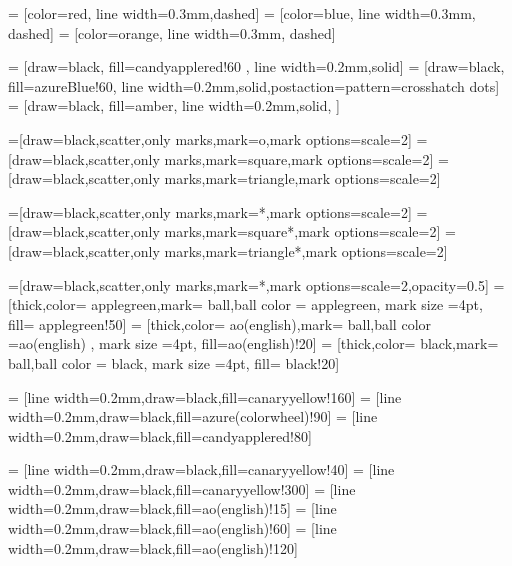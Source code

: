                 = [color=red, line width=0.3mm,dashed]
   = [color=blue, line width=0.3mm, dashed]
  = [color=orange, line width=0.3mm, dashed]


 = [draw=black, fill=candyapplered!60   , line width=0.2mm,solid]
 = [draw=black, fill=azureBlue!60, line width=0.2mm,solid,postaction={pattern=crosshatch dots}]
 = [draw=black, fill=amber, line width=0.2mm,solid,  ]



=[draw=black,scatter,only marks,mark=o,mark options={scale=2}] 
   =[draw=black,scatter,only marks,mark=square,mark options={scale=2}]
  =[draw=black,scatter,only marks,mark=triangle,mark options={scale=2}]

=[draw=black,scatter,only marks,mark=*,mark options={scale=2}] 
   =[draw=black,scatter,only marks,mark=square*,mark options={scale=2}]
  =[draw=black,scatter,only marks,mark=triangle*,mark options={scale=2}]

=[draw=black,scatter,only marks,mark=*,mark options={scale=2},opacity=0.5]
 = [thick,color= applegreen,mark= ball,ball color = applegreen, mark size =4pt, fill= applegreen!50]
    = [thick,color= ao(english),mark= ball,ball color =ao(english) , mark size =4pt, fill=ao(english)!20]
   = [thick,color= black,mark= ball,ball color = black, mark size =4pt, fill= black!20]


 =   [line width=0.2mm,draw=black,fill=canaryyellow!160]
 =   [line width=0.2mm,draw=black,fill=azure(colorwheel)!90]
 = [line width=0.2mm,draw=black,fill=candyapplered!80]

 = [line width=0.2mm,draw=black,fill=canaryyellow!40]
 = [line width=0.2mm,draw=black,fill=canaryyellow!300]
 = [line width=0.2mm,draw=black,fill=ao(english)!15]
 = [line width=0.2mm,draw=black,fill=ao(english)!60]
 = [line width=0.2mm,draw=black,fill=ao(english)!120]


